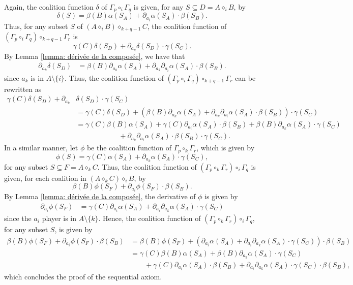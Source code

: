 \documentclass[a4paper,12pt]{amsart}
\begin{document}
\medskip

Again, the coalition function $\delta$ of $\Gamma_p \circ_i \Gamma_q$ is given, for any $S \subseteq D = A \diamond_i B$, by 
\[
\delta(S) = \beta(B)\alpha(S_A) + \partial_{a_i} \alpha(S_A) \cdot \beta(S_B). 
\]
Thus, for any subset $S$ of $(A \diamond_i B) \diamond_{k+q-1} C$, the coalition function of $\left(\Gamma_p \circ_i \Gamma_q \right) \circ_{k+q-1} \Gamma_r$ is 
\[
\gamma(C)\delta(S_D) + \partial_{a_k} \delta(S_D) \cdot \gamma(S_C). 
\]
By Lemma \ref{lemma: dérivée de la composée}, we have that
\[ \begin{aligned}
\partial_{a_k} \delta(S_D) & = \beta(B)\partial_{a_k} \alpha(S_A) + \partial_{a_k} \partial_{a_i} \alpha(S_A) \cdot \beta(S_B).
\end{aligned} 
\]
since $a_k$ is in $A \setminus \{i\}$. Thus, the coalition function of $\left( \Gamma_p \circ_i \Gamma_q \right) \circ_{k+q-1} \Gamma_r$ can be rewritten as 
\[ \begin{aligned} 
\gamma(C)\delta(S_D) + \partial_{a_k} & \delta(S_D) \cdot \gamma(S_C) \\ & = \gamma(C)\delta(S_D) + \left( \beta(B)\partial_{a_k} \alpha(S_A) + \partial_{a_k}\partial_{a_i} \alpha(S_A) \cdot \beta(S_B) \right)\cdot \gamma(S_C) \\
& = \gamma(C)\beta(B)\alpha(S_A) + \gamma(C)\partial_{a_i} \alpha(S_A) \cdot \beta(S_B) + \beta(B)\partial_{a_k} \alpha(S_A) \cdot \gamma(S_C) \\ 
& \qquad \qquad \qquad + \partial_{a_k}\partial_{a_i}\alpha(S_A) \cdot \beta(S_B) \cdot \gamma(S_C). 
\end{aligned} \]
In a similar manner, let $\phi$ be the coalition function of $\Gamma_p \circ_k \Gamma_r$, which is given by 
\[
\phi(S) = \gamma(C)\alpha(S_A) + \partial_{a_k} \alpha(S_A) \cdot \gamma(S_C),
\]
for any subset $S \subseteq F = A \diamond_k C$. Thus, the coalition function of $\left( \Gamma_p \circ_k \Gamma_r \right) \circ_i \Gamma_q$ is given, for each coalition in $(A \diamond_k C) \diamond_i B$, by 
\[
\beta(B)\phi(S_F) + \partial_{a_i} \phi(S_F) \cdot \beta(S_B).
\]
By Lemma \ref{lemma: dérivée de la composée}, the derivative of $\phi$ is given by  
\[ \begin{aligned} 
\partial_{a_i} \phi(S_F) & = \gamma(C)\partial_{a_i} \alpha(S_A) + \partial_{a_i} \partial_{a_k} \alpha(S_A ) \cdot \gamma(S_C)
\end{aligned} \]
since the $a_i$ player is in $A \setminus \{k\}.$ Hence, the coalition function of $\left( \Gamma_p \circ_k \Gamma_r \right) \circ_i \Gamma_q$, for any subset $S$, is given by 
\[ \begin{aligned} 
\beta(B)\phi(S_F) + \partial_{a_i} \phi(S_F) \cdot \beta(S_B) & = \beta(B)\phi(S_F) + \left( \partial_{a_i} \alpha(S_A) + \partial_{a_i} \partial_{a_k} \alpha(S_A) \cdot \gamma(S_C) \right) \cdot \beta(S_B) \\
& = \gamma(C)\beta(B)\alpha(S_A) + \beta(B)\partial_{a_k} \alpha(S_A) \cdot \gamma(S_C) ~\\
& \qquad + \gamma(C) \partial_{a_i} \alpha(S_A) \cdot \beta(S_B) + \partial_{a_i} \partial_{a_k} \alpha(S_A) \cdot \gamma(S_C) \cdot \beta(S_B),
\end{aligned} \]
which concludes the proof of the sequential axiom. 
\end{document}
